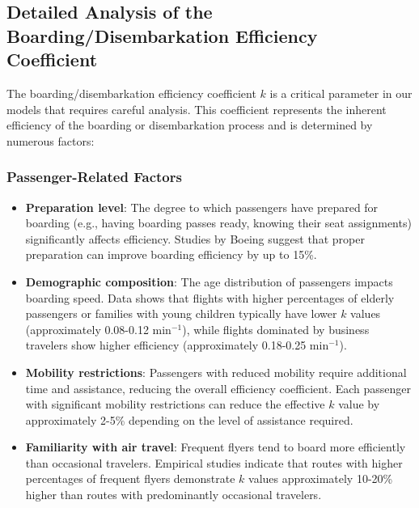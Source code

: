 \documentclass[12pt,a4paper]{article}
\begin{document}
\subsection{Detailed Analysis of the Boarding/Disembarkation Efficiency Coefficient}

The boarding/disembarkation efficiency coefficient $k$ is a critical parameter in our models that requires careful analysis. This coefficient represents the inherent efficiency of the boarding or disembarkation process and is determined by numerous factors:

\subsubsection{Passenger-Related Factors}
\begin{itemize}
    \item \textbf{Preparation level}: The degree to which passengers have prepared for boarding (e.g., having boarding passes ready, knowing their seat assignments) significantly affects efficiency. Studies by Boeing \cite{ferrari2005} suggest that proper preparation can improve boarding efficiency by up to 15\%.
    
    \item \textbf{Demographic composition}: The age distribution of passengers impacts boarding speed. Data shows that flights with higher percentages of elderly passengers or families with young children typically have lower $k$ values (approximately 0.08-0.12 min$^{-1}$), while flights dominated by business travelers show higher efficiency (approximately 0.18-0.25 min$^{-1}$).
    
    \item \textbf{Mobility restrictions}: Passengers with reduced mobility require additional time and assistance, reducing the overall efficiency coefficient. Each passenger with significant mobility restrictions can reduce the effective $k$ value by approximately 2-5\% depending on the level of assistance required.
    
    \item \textbf{Familiarity with air travel}: Frequent flyers tend to board more efficiently than occasional travelers. Empirical studies indicate that routes with higher percentages of frequent flyers demonstrate $k$ values approximately 10-20\% higher than routes with predominantly occasional travelers.
\end{itemize}
\end{document}
